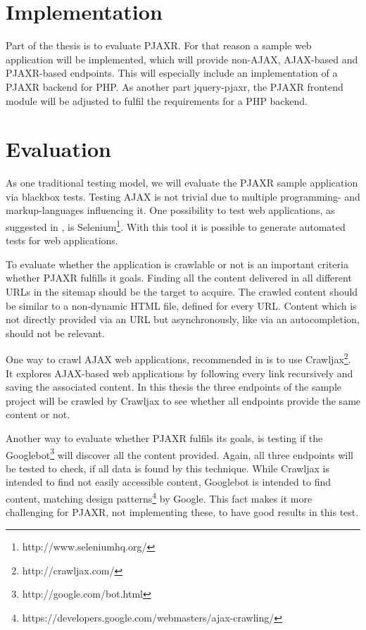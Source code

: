 \documentclass[f,bachelor,binding,twoside,palatino]{WeSTthesis}
\def \ajax {AJAX}
\def \pjaxr {PJAXR}
\def \jqueryPjaxr {jquery-pjaxr}
\begin{document}
\section{Implementation}
  Part of the thesis is to evaluate \pjaxr{}. For that reason a sample web application will be implemented, which will provide non-\ajax{}, \ajax{}-based and \pjaxr{}-based endpoints.
  This will especially include an implementation of a \pjaxr{} backend for PHP. As another part \jqueryPjaxr{}, the \pjaxr{} frontend module will be adjusted to fulfil the requirements for a PHP backend.

\section{Evaluation}
  As one traditional testing model, we will evaluate the \pjaxr{} sample application via blackbox tests.
  Testing \ajax{} is not trivial due to multiple programming- and markup-languages influencing it. 
  One possibility to test web applications, as suggested in \cite{lundmark11}, is Selenium\footnote{http://www.seleniumhq.org/}.
  With this tool it is possible to generate automated tests for web applications.

  To evaluate whether the application is crawlable or not is an important criteria whether \pjaxr{} fulfills it goals.
  Finding all the content delivered in all different URLs in the sitemap should be the target to acquire.
  The crawled content should be similar to a non-dynamic HTML file, defined for every URL.
  Content which is not directly provided via an URL but asynchronously, like via an autocompletion, should not be relevant.

  One way to crawl \ajax{} web applications, recommended in \cite{crawljax:tweb12} is to use Crawljax\footnote{http://crawljax.com/}. 
  It explores \ajax{}-based web applications by following every link recursively and saving the associated content. In this thesis the three endpoints of the sample project will be crawled by Crawljax to see whether all endpoints provide the same content or not.
  
  Another way to evaluate whether \pjaxr{} fulfils its goals, is testing if the Googlebot\footnote{http://google.com/bot.html} will discover all the content provided.
  Again, all three endpoints will be tested to check, if all data is found by this technique.
  While Crawljax is intended to find not easily accessible content, Googlebot is intended to find content, matching design patterns\footnote{https://developers.google.com/webmasters/ajax-crawling/} by Google. This fact makes it more challenging for \pjaxr{}, not implementing these, to have good results in this test.
\end{document}
